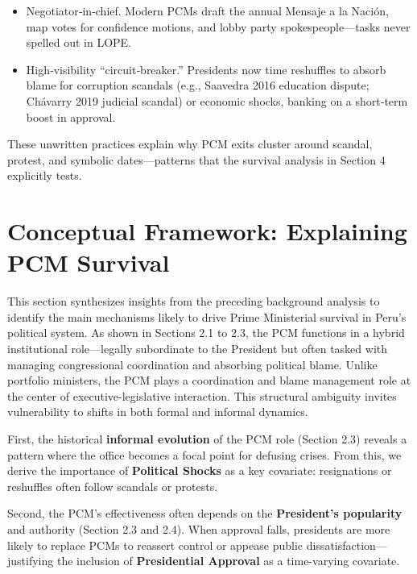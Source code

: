 \documentclass[a4paper, 12pt]{article}
\begin{document}
\begin{itemize}
\item Negotiator‑in‑chief. Modern PCMs draft the annual Mensaje a la Nación, map votes for confidence motions, and lobby party spokespeople—tasks never spelled out in LOPE.

\item High‑visibility “circuit‑breaker.” Presidents now time reshuffles to absorb blame for corruption scandals (e.g., Saavedra 2016 education dispute; Chávarry 2019 judicial scandal) or economic shocks, banking on a short‑term boost in approval.

\end{itemize}


These unwritten practices explain why PCM exits cluster around scandal, protest, and symbolic dates—patterns that the survival analysis in Section 4 explicitly tests.





\section{Conceptual Framework: Explaining PCM Survival}\label{concepframe}

This section synthesizes insights from the preceding background analysis to identify the main mechanisms likely to drive Prime Ministerial survival in Peru's political system. As shown in Sections 2.1 to 2.3, the PCM functions in a hybrid institutional role—legally subordinate to the President but often tasked with managing congressional coordination and absorbing political blame. Unlike portfolio ministers, the PCM plays a coordination and blame management role at the center of executive-legislative interaction. This structural ambiguity invites vulnerability to shifts in both formal and informal dynamics.

First, the historical \textbf{informal evolution} of the PCM role (Section 2.3) reveals a pattern where the office becomes a focal point for defusing crises. From this, we derive the importance of \textbf{Political Shocks} as a key covariate: resignations or reshuffles often follow scandals or protests.

Second, the PCM’s effectiveness often depends on the \textbf{President's popularity} and authority (Section 2.3 and 2.4). When approval falls, presidents are more likely to replace PCMs to reassert control or appease public dissatisfaction---justifying the inclusion of \textbf{Presidential Approval} as a time-varying covariate.
\end{document}
